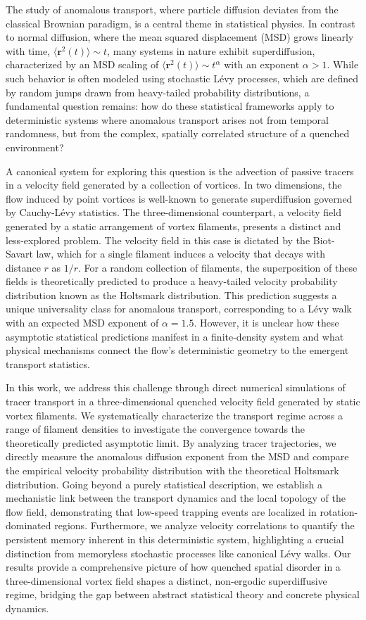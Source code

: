 \documentclass[]{article}
\begin{document}
The study of anomalous transport, where particle diffusion deviates from the classical Brownian paradigm, is a central theme in statistical physics. In contrast to normal diffusion, where the mean squared displacement (MSD) grows linearly with time, $\langle \mathbf{r}^2(t) \rangle \sim t$, many systems in nature exhibit superdiffusion, characterized by an MSD scaling of $\langle \mathbf{r}^2(t) \rangle \sim t^\alpha$ with an exponent $\alpha > 1$. While such behavior is often modeled using stochastic Lévy processes, which are defined by random jumps drawn from heavy-tailed probability distributions, a fundamental question remains: how do these statistical frameworks apply to deterministic systems where anomalous transport arises not from temporal randomness, but from the complex, spatially correlated structure of a quenched environment?

A canonical system for exploring this question is the advection of passive tracers in a velocity field generated by a collection of vortices. In two dimensions, the flow induced by point vortices is well-known to generate superdiffusion governed by Cauchy-Lévy statistics. The three-dimensional counterpart, a velocity field generated by a static arrangement of vortex filaments, presents a distinct and less-explored problem. The velocity field in this case is dictated by the Biot-Savart law, which for a single filament induces a velocity that decays with distance $r$ as $1/r$. For a random collection of filaments, the superposition of these fields is theoretically predicted to produce a heavy-tailed velocity probability distribution known as the Holtsmark distribution. This prediction suggests a unique universality class for anomalous transport, corresponding to a Lévy walk with an expected MSD exponent of $\alpha = 1.5$. However, it is unclear how these asymptotic statistical predictions manifest in a finite-density system and what physical mechanisms connect the flow's deterministic geometry to the emergent transport statistics.

In this work, we address this challenge through direct numerical simulations of tracer transport in a three-dimensional quenched velocity field generated by static vortex filaments. We systematically characterize the transport regime across a range of filament densities to investigate the convergence towards the theoretically predicted asymptotic limit. By analyzing tracer trajectories, we directly measure the anomalous diffusion exponent from the MSD and compare the empirical velocity probability distribution with the theoretical Holtsmark distribution. Going beyond a purely statistical description, we establish a mechanistic link between the transport dynamics and the local topology of the flow field, demonstrating that low-speed trapping events are localized in rotation-dominated regions. Furthermore, we analyze velocity correlations to quantify the persistent memory inherent in this deterministic system, highlighting a crucial distinction from memoryless stochastic processes like canonical Lévy walks. Our results provide a comprehensive picture of how quenched spatial disorder in a three-dimensional vortex field shapes a distinct, non-ergodic superdiffusive regime, bridging the gap between abstract statistical theory and concrete physical dynamics.
\end{document}
